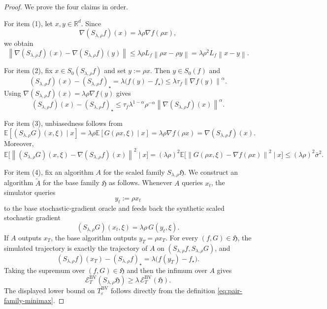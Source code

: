 \documentclass[11pt]{article}
\newcommand{\R}{\mathbb{R}}
\newcommand{\E}{\mathbb{E}}
\newcommand{\norm}[1]{\left\lVert #1\right\rVert}
\begin{document}
\begin{proof}
We prove the four claims in order.

For item (1), let $x,y\in\R^d$.
Since
\[
\nabla (S_{\lambda,\rho}f)(x)=\lambda \rho \nabla f(\rho x),
\]
we obtain
\[
\norm{\nabla (S_{\lambda,\rho}f)(x)-\nabla (S_{\lambda,\rho}f)(y)}
\le
\lambda \rho L_f \norm{\rho x-\rho y}
=
\lambda \rho^2 L_f \norm{x-y}.
\]

For item (2), fix $x\in S_0(S_{\lambda,\rho}f)$ and set $y:=\rho x$.
Then $y\in S_0(f)$ and
\[
(S_{\lambda,\rho}f)(x)-(S_{\lambda,\rho}f)_\star
=
\lambda \bigl(f(y)-f_\star\bigr)
\le
\lambda \tau_f \norm{\nabla f(y)}^\alpha.
\]
Using $\nabla (S_{\lambda,\rho}f)(x)=\lambda \rho \nabla f(y)$ gives
\[
(S_{\lambda,\rho}f)(x)-(S_{\lambda,\rho}f)_\star
\le
\tau_f \lambda^{1-\alpha}\rho^{-\alpha}\norm{\nabla (S_{\lambda,\rho}f)(x)}^\alpha.
\]

For item (3), unbiasedness follows from
\[
\E[(S_{\lambda,\rho}G)(x,\xi)\mid x]
=
\lambda \rho \E[G(\rho x,\xi)\mid x]
=
\lambda \rho \nabla f(\rho x)
=
\nabla (S_{\lambda,\rho}f)(x).
\]
Moreover,
\[
\E\bigl[\norm{(S_{\lambda,\rho}G)(x,\xi)-\nabla (S_{\lambda,\rho}f)(x)}^2\mid x\bigr]
=
(\lambda \rho)^2 \E\bigl[\norm{G(\rho x,\xi)-\nabla f(\rho x)}^2\mid x\bigr]
\le
(\lambda \rho)^2 \bar \sigma^2.
\]

For item (4), fix an algorithm \(A\) for the scaled family \(S_{\lambda,\rho}\mathfrak H\). We construct an algorithm
\(\widetilde A\) for the base family \(\mathfrak H\) as follows. Whenever \(A\) queries \(x_t\), the simulator queries
\[
y_t:=\rho x_t
\]
to the base stochastic-gradient oracle and feeds back the synthetic scaled stochastic gradient
\[
(S_{\lambda,\rho}G)(x_t,\xi)=\lambda \rho\, G(y_t,\xi).
\]
If \(A\) outputs \(x_T\), the base algorithm outputs \(y_T=\rho x_T\). For every \((f,G)\in\mathfrak H\), the simulated
trajectory is exactly the trajectory of \(A\) on \((S_{\lambda,\rho}f,S_{\lambda,\rho}G)\), and
\[
(S_{\lambda,\rho}f)(x_T)-(S_{\lambda,\rho}f)_\star
=
\lambda\bigl(f(y_T)-f_\star\bigr).
\]
Taking the supremum over \((f,G)\in\mathfrak H\) and then the infimum over \(A\) gives
\[
\mathcal E_T^{\mathrm{BV}}(S_{\lambda,\rho}\mathfrak H)
\ge
\lambda\,\mathcal E_T^{\mathrm{BV}}(\mathfrak H).
\]
The displayed lower bound on \(T_\varepsilon^{\mathrm{BV}}\) follows directly from the definition
\eqref{eq:pair-family-minimax}.
\end{proof}
\end{document}
